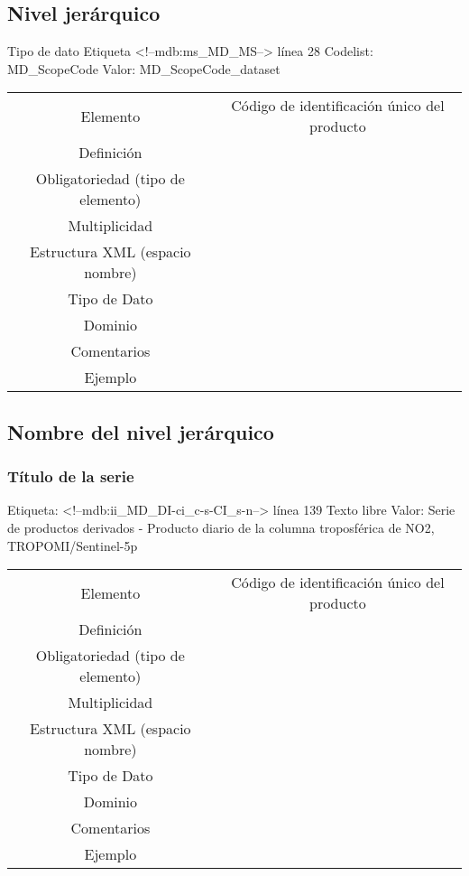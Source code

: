 \documentclass{GVT_CONAE_Class}
\begin{document}
\subsection{Nivel jerárquico}
Tipo de dato
Etiqueta <!--mdb:ms\_MD\_MS--> línea 28
Codelist: MD\_ScopeCode
Valor: MD\_ScopeCode\_dataset
\begin{tabular}{c|c}
    Elemento & Código de identificación único del producto \\
    Definición & \\
    Obligatoriedad (tipo de elemento) & \\
    Multiplicidad & \\
    Estructura XML (espacio nombre) & \\
    Tipo de Dato & \\
    Dominio & \\
    Comentarios & \\
    Ejemplo & \\
\end{tabular}


\subsection{Nombre del nivel jerárquico} 
\subsubsection{Título de la serie}
Etiqueta: <!--mdb:ii\_MD\_DI-ci\_c-s-CI\_s-n--> línea 139
Texto libre
Valor:  Serie de productos derivados - Producto diario de la columna troposférica de NO2, TROPOMI/Sentinel-5p
\begin{tabular}{c|c}
    Elemento & Código de identificación único del producto \\
    Definición & \\
    Obligatoriedad (tipo de elemento) & \\
    Multiplicidad & \\
    Estructura XML (espacio nombre) & \\
    Tipo de Dato & \\
    Dominio & \\
    Comentarios & \\
    Ejemplo & \\
\end{tabular}
\end{document}
